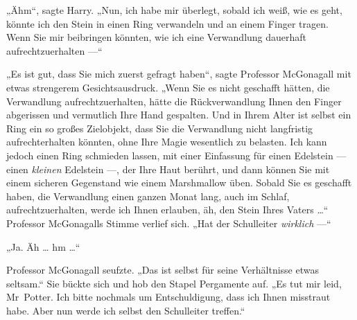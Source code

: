 „Ähm“, sagte Harry.
„Nun, ich habe mir überlegt, sobald ich weiß, wie es geht, könnte ich den Stein in einen Ring verwandeln und an einem Finger tragen. Wenn Sie mir beibringen könnten, wie ich eine Verwandlung dauerhaft aufrechtzuerhalten —“

„Es ist gut, dass Sie mich zuerst gefragt haben“, sagte Professor McGonagall mit etwas strengerem Gesichtsausdruck.
„Wenn Sie es nicht geschafft hätten, die Verwandlung aufrechtzuerhalten, hätte die Rückverwandlung Ihnen den Finger abgerissen und vermutlich Ihre Hand gespalten. Und in Ihrem Alter ist selbst ein Ring ein so großes Zielobjekt, dass Sie die Verwandlung nicht langfristig aufrechterhalten könnten, ohne Ihre Magie wesentlich zu belasten. Ich kann jedoch einen Ring schmieden lassen, mit einer Einfassung für einen Edelstein — einen \emph{kleinen} Edelstein —, der Ihre Haut berührt, und dann können Sie mit einem sicheren Gegenstand wie einem Marshmallow üben. Sobald Sie es geschafft haben, die Verwandlung einen ganzen Monat lang, auch im Schlaf, aufrechtzuerhalten, werde ich Ihnen erlauben, äh, den Stein Ihres Vaters …“ Professor McGonagalls Stimme verlief sich.
„Hat der Schulleiter \emph{wirklich} —“

„Ja. Äh … hm …“

Professor McGonagall seufzte.
„Das ist selbst für seine Verhältnisse etwas seltsam.“ Sie bückte sich und hob den Stapel Pergamente auf.
„Es tut mir leid, Mr~Potter. Ich bitte nochmals um Entschuldigung, dass ich Ihnen misstraut habe. Aber nun werde ich selbst den Schulleiter treffen.“

